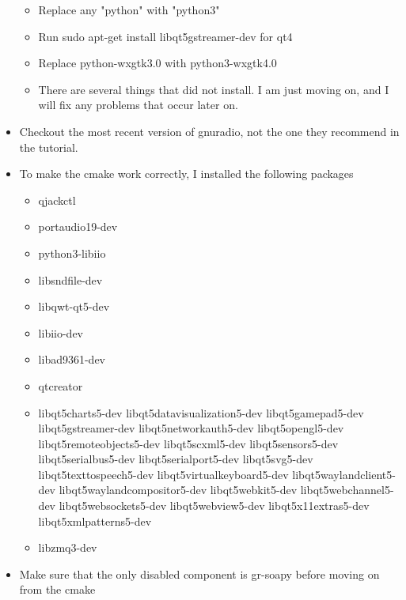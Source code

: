 \documentclass{article}
\begin{document}
\begin{itemize}
\begin{itemize}
        \item Replace any "python" with "python3"
        \item Run sudo apt-get install libqt5gstreamer-dev for qt4
        \item Replace python-wxgtk3.0 with python3-wxgtk4.0
        \item There are several things that did not install. I am just moving on, and I will fix any problems that occur later on.
    \end{itemize}
    
    \item Checkout the most recent version of gnuradio, not the one they recommend in the tutorial.
    \item To make the cmake work correctly, I installed the following packages
    \begin{itemize}
        \item qjackctl
        \item portaudio19-dev
        \item python3-libiio
        \item libsndfile-dev
        \item libqwt-qt5-dev 
        \item libiio-dev
        \item libad9361-dev 
        \item qtcreator
        \item libqt5charts5-dev libqt5datavisualization5-dev libqt5gamepad5-dev libqt5gstreamer-dev libqt5networkauth5-dev libqt5opengl5-dev libqt5remoteobjects5-dev libqt5scxml5-dev libqt5sensors5-dev libqt5serialbus5-dev libqt5serialport5-dev libqt5svg5-dev libqt5texttospeech5-dev libqt5virtualkeyboard5-dev libqt5waylandclient5-dev libqt5waylandcompositor5-dev libqt5webkit5-dev libqt5webchannel5-dev libqt5websockets5-dev libqt5webview5-dev libqt5x11extras5-dev libqt5xmlpatterns5-dev
        \item libzmq3-dev 
    \end{itemize}
    \item Make sure that the only disabled component is gr-soapy before moving on from the cmake

\end{itemize}
\end{document}

